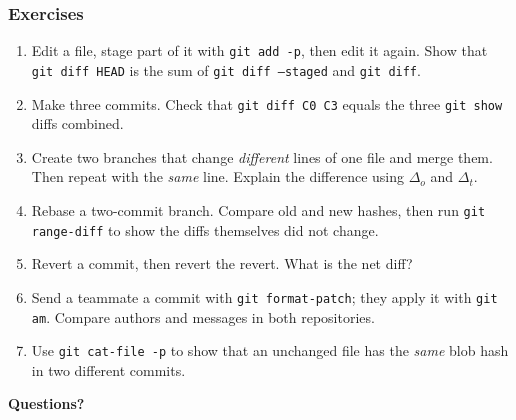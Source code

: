 \documentclass[aspectratio=169,10pt,compress]{beamer}
\newcommand{\cmd}[1]{\texttt{\color{gitred}#1}}
\begin{document}
\begin{frame}[t,fragile] \frametitle{Exercises}
  \begin{enumerate}\small
    \item Edit a file, stage part of it with \cmd{git add -p}, then edit it again.
          Show that \cmd{git diff HEAD} is the sum of \cmd{git diff --staged} and \cmd{git diff}.
    \item Make three commits. Check that \cmd{git diff C0 C3} equals the three
          \cmd{git show} diffs combined.
    \item Create two branches that change \emph{different} lines of one file and merge them.
          Then repeat with the \emph{same} line. Explain the difference using $\Delta_o$ and $\Delta_t$.
    \item Rebase a two-commit branch. Compare old and new hashes, then run
          \cmd{git range-diff} to show the diffs themselves did not change.
    \item Revert a commit, then revert the revert. What is the net diff?
    \item Send a teammate a commit with \cmd{git format-patch}; they apply it with \cmd{git am}.
          Compare authors and messages in both repositories.
    \item Use \cmd{git cat-file -p} to show that an unchanged file has the \emph{same}
          blob hash in two different commits.
  \end{enumerate}

  \vspace{0.3em}
  \begin{center}
    {\Large \textbf{Questions?}}
  \end{center}
\end{frame}
\end{document}
